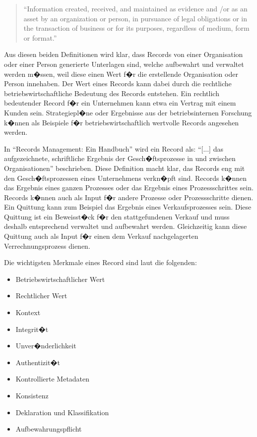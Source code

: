 \documentclass[a4paper,twoside,10pt]{report}
\begin{document}
\begin{quotation}
	"`Information created, received, and maintained as evidence and /or as an asset 
	by  an  organization  or  person,  in  pursuance  of  legal  obligations  or  in  the 
	transaction  of  business  or  for  its  purposes,  regardless  of  medium,  form  or 
	format."'\cite{ISO30300}
\end{quotation}

Aus diesen beiden Definitionen wird klar, dass Records von einer Organisation oder einer Person generierte Unterlagen sind, welche aufbewahrt und verwaltet werden m�ssen, weil diese einen Wert f�r die erstellende Organisation oder Person innehaben. Der Wert eines Records kann dabei durch die rechtliche betriebswirtschaftliche Bedeutung des Records entstehen. Ein rechtlich bedeutender Record f�r ein Unternehmen kann etwa ein Vertrag mit einem Kunden sein. Strategiepl�ne oder Ergebnisse aus der betriebsinternen Forschung k�nnen als Beispiele f�r betriebswirtschaftlich wertvolle Records angesehen werden.

In "`Records Management: Ein Handbuch"' wird ein Record als: "`[...] das aufgezeichnete, schriftliche Ergebnis der Gesch�ftsprozesse in und zwischen Organisationen"' beschrieben. Diese Definition macht klar, das Records eng mit den Gesch�ftsprozessen eines Unternehmens verkn�pft sind. Records k�nnen das Ergebnis eines ganzen Prozesses oder das Ergebnis eines Prozessschrittes sein. Records k�nnen auch als Input f�r andere Prozesse oder Prozessschritte dienen. Ein Quittung kann zum Beispiel das Ergebnis eines Verkaufsprozesses sein. Diese Quittung ist ein Beweisst�ck f�r den stattgefundenen Verkauf und muss deshalb entsprechend verwaltet und aufbewahrt werden. Gleichzeitig kann diese Quittung auch als Input f�r einen dem Verkauf nachgelagerten Verrechnungsprozess dienen. \cite{rmHandbook}

Die wichtigsten Merkmale eines Record sind laut \citeauthor{rmprinzipien} die folgenden:

\begin{itemize}
  \itemsep0em
	\item Betriebswirtschaftlicher Wert
	\item Rechtlicher Wert
	\item Kontext
	\item Integrit�t
	\item Unver�nderlichkeit
	\item Authentizit�t
	\item Kontrollierte Metadaten
	\item Konsistenz
	\item Deklaration und Klassifikation
	\item Aufbewahrungspflicht
\end{itemize}
\end{document}
